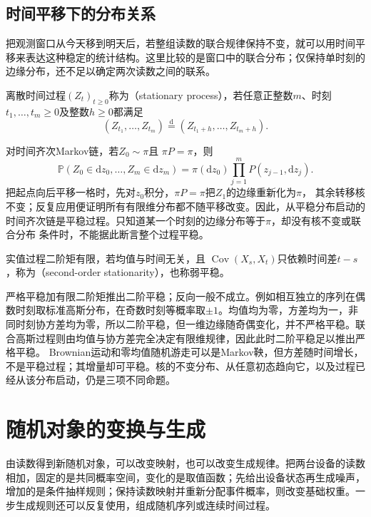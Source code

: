 \subsection{时间平移下的分布关系}
\label{sec:rv-stationarity}
把观测窗口从今天移到明天后，若整组读数的联合规律保持不变，就可以用时间平移来表达这种稳定的统计结构。这里比较的是窗口中的联合分布；仅保持单时刻的边缘分布，还不足以确定两次读数之间的联系。
\begin{definition}[平稳过程]
  \label{def:stoch-stationary-process}
  离散时间过程\((Z_t)_{t\geq0}\)称为（stationary process），若任意正整数\(m\)、时刻\(t_1,\ldots,t_m\geq0\)及整数\(h\geq0\)都满足
  \[ (Z_{t_1},\ldots,Z_{t_m})\overset{\mathrm d}{=}(Z_{t_1+h},\ldots,Z_{t_m+h}). \]
\end{definition}
对时间齐次Markov链，若$Z_0\sim\pi$且
$\pi P=\pi$，则
\[
  \mathbb{P}(Z_0\in\mathrm{d}z_0,\ldots,Z_m\in\mathrm{d}z_m)
  =
  \pi(\mathrm{d}z_0)
  \prod_{j=1}^{m}P(z_{j-1},\mathrm{d}z_j).
\]
把起点向后平移一格时，先对$z_0$积分，$\pi P=\pi$把$Z_1$的边缘重新化为$\pi$，
其余转移核不变；反复应用便证明所有有限维分布都不随平移改变。因此，从平稳分布启动的
时间齐次链是平稳过程。只知道某一个时刻的边缘分布等于$\pi$，却没有核不变或联合分布
条件时，不能据此断言整个过程平稳。
\begin{definition}[二阶平稳]
\label{def:rv-second-order-stationary}
实值过程二阶矩有限，若均值与时间无关，且
\(\operatorname{Cov}(X_s,X_t)\)只依赖时间差\(t-s\)，称为（second-order stationarity），也称弱平稳。
\end{definition}
严格平稳加有限二阶矩推出二阶平稳；反向一般不成立。例如相互独立的序列在偶数时刻取标准高斯分布，在奇数时刻等概率取\(\pm1\)。均值均为零，方差均为一，非同时刻协方差均为零，所以二阶平稳，但一维边缘随奇偶变化，并不严格平稳。联合高斯过程则由均值与协方差完全决定有限维规律，因此此时二阶平稳足以推出严格平稳。
Brownian运动和零均值随机游走可以是Markov鞅，但方差随时间增长，不是平稳过程；其增量却可平稳。核的不变分布、从任意初态趋向它，以及过程已经从该分布启动，仍是三项不同命题。

\section{随机对象的变换与生成}
\label{sec:rv-transformations}
\label{sec:probability-random-vectors-transformations}
由读数得到新随机对象，可以改变映射，也可以改变生成规律。把两台设备的读数相加，固定的是共同概率空间，变化的是取值函数；先给出设备状态再生成噪声，增加的是条件抽样规则；保持读数映射并重新分配事件概率，则改变基础权重。一步生成规则还可以反复使用，组成随机序列或连续时间过程。

